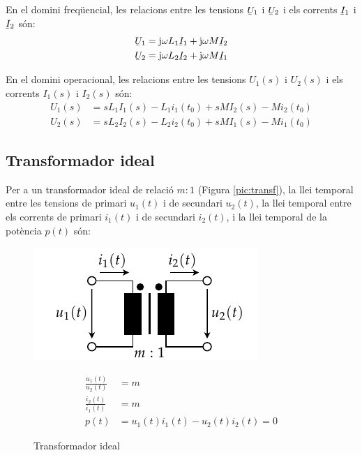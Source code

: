 En el domini freq\"{u}encial, les relacions entre les tensions $\cmplx{U}_1$ i $\cmplx{U}_2$ i els corrents $\cmplx{I}_1$ i $\cmplx{I}_2$ s\'{o}n:
\begin{align}
   \cmplx{U}_1 &= \ju \omega L_1 \cmplx{I}_1 + \ju \omega M \cmplx{I}_2 \\
   \cmplx{U}_2 &= \ju \omega L_2 \cmplx{I}_2 + \ju \omega M \cmplx{I}_1
\end{align}

En el domini operacional, les relacions entre les tensions $U_1(s)$  i $U_2(s)$ i els corrents $I_1(s)$ i $I_2(s)$ s\'{o}n:
\begin{align}
   U_1(s) &= s L_1 I_1(s) - L_1 i_1(t_0) + s M I_2(s) - M i_2(t_0) \\
   U_2(s) &= s L_2 I_2(s) - L_2 i_2(t_0) + s M I_1(s) - M i_1(t_0)
\end{align}

\subsection{Transformador ideal} 

Per a un transformador
ideal de relaci\'{o} $m:1$ (Figura \vref{pic:transf}), la llei temporal
entre les tensions de primari $u_1(t)$ i de secundari $u_2(t)$, la
llei temporal entre els corrents de primari $i_1(t)$ i de secundari
$i_2(t)$, i la llei temporal de la pot\`{e}ncia $p(t)$ s\'{o}n:
\begin{figure}[htb]
\hfill
\begin{minipage}[b]{6cm}
    \includegraphics{Imatges/Cap-Fonaments-Trafo-Ideal.pdf}
\caption{Transformador ideal} \label{pic:transf}
\end{minipage}
\hfill
\begin{minipage}[b][3.7cm][t]{10cm}
   \begin{align}
      \frac{u_1(t)}{u_2(t)} &= m  \\
      \frac{i_2(t)}{i_1(t)} &= m \\
      p(t) &= u_1(t) i_1(t) - u_2(t) i_2(t) = 0
   \end{align}
\end{minipage}
\end{figure}

